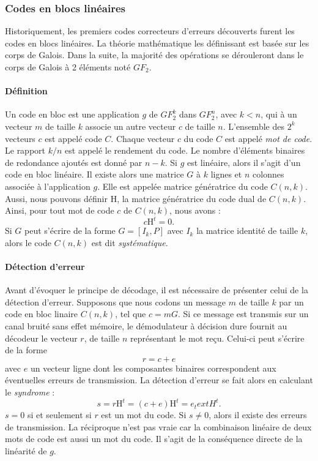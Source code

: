 \subsubsection{Codes en blocs linéaires}
Historiquement, les premiers codes correcteurs d'erreurs découverts furent les codes en blocs linéaires. La théorie 
mathématique les définissant est basée sur les corps de Galois. Dans la suite, la majorité des opérations se dérouleront 
dans le corps de Galois à 2 éléments noté $GF_2$.
\paragraph*{Définition}
Un code en bloc est une application $g$ de $GF_2^k$ dans $GF_2^n$, avec $k<n$, qui à un vecteur $m$ de taille $k$ associe
un autre vecteur $c$ de taille $n$. L'ensemble des $2^k$ vecteurs $c$ est appelé code $C$. Chaque vecteur $c$ du code $C$ est appelé \textit{mot de code}. 
Le rapport $k/n$  est appelé le 
rendement du code. Le nombre d'éléments binaires de redondance ajoutés est donné par $n-k$. Si $g$ est linéaire, alors 
il s'agit d'un code en bloc linéaire. Il existe alors une matrice $G$ à $k$ lignes et $n$ colonnes associée à 
l'application $g$. Elle est appelée matrice génératrice du code $C(n,k)$. \\
Aussi, nous pouvons définir $\text{H}$, la matrice génératrice du code dual de $C(n,k)$. Ainsi, pour tout mot de code $c$ de 
$C(n,k)$, nous avons : \[c\text{H}^t = 0.\]
Si $G$ peut s'écrire de la forme $G=[I_k,P]$ avec $I_k$ la matrice identité de taille $k$, alors  le code $C(n,k)$ est dit
\emph{systématique}.
\paragraph*{Détection d'erreur}
Avant d'évoquer le principe de décodage, il est nécessaire de présenter celui de la détection d'erreur. Supposons que 
nous codons un message $m$ de taille $k$ par un code en bloc linaire $C(n,k)$, tel que $c = mG$. Si ce message est 
transmis sur un canal bruité sans effet mémoire, le démodulateur à décision dure fournit au décodeur le vecteur $r$, de 
taille $n$ représentant le mot reçu. Celui-ci peut s'écrire de la forme \[r=c+e\] avec $e$
un vecteur ligne dont les composantes binaires correspondent aux éventuelles erreurs de transmission. La détection 
d'erreur se fait alors en calculant le \emph{syndrome} : \[s = r\text{H}^t = (c+e)\text{H}^t = e_text{H}^t.\]
$s=0$ si et seulement si $r$  est un mot du code. Si $s \ne 0$, alors il existe des erreurs de transmission. La 
réciproque n'est pas vraie car la combinaison linéaire de deux mots de code est aussi un mot du code. Il s'agit de la 
conséquence directe de la linéarité de $g$.
